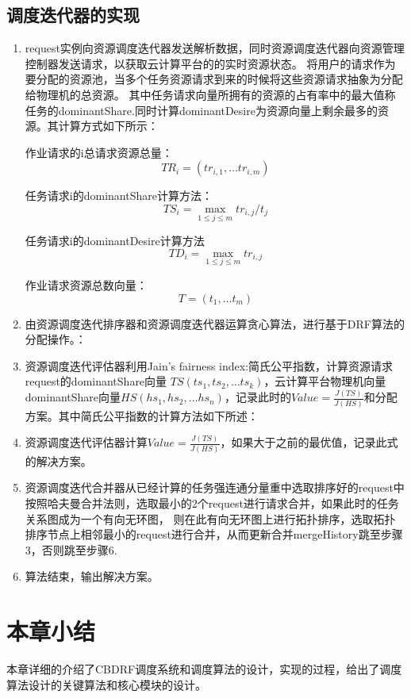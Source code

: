 \subsection{调度迭代器的实现}
\begin{enumerate}
\item request实例向资源调度迭代器发送解析数据，同时资源调度迭代器向资源管理控制器发送请求，以获取云计算平台的的实时资源状态。
将用户的请求作为要分配的资源池，当多个任务资源请求到来的时候将这些资源请求抽象为分配给物理机的总资源。
其中任务请求向量所拥有的资源的占有率中的最大值称任务的dominantShare.同时计算dominantDesire为资源向量上剩余最多的资源。其计算方式如下所示：

作业请求的i总请求资源总量：
\begin{equation}
{TR}_{i}=\left({tr}_{i,1},…{tr}_{i,m}\right)
\end{equation}

任务请求i的dominantShare计算方法：
\begin{equation}
{TS}_{i}=\max \limits_{1 \leq j \leq m} {{tr}_{i,j}}/{{t}_{j}}
\end{equation}

任务请求i的dominantDesire计算方法
\begin{equation}
{TD}_{i}=\max \limits_{1 \leq j \leq m} {tr}_{i,j}
\end{equation}

作业请求资源总数向量：
\begin{equation}
T=\left({t}_{1},…{t}_{m}\right)
\end{equation}
\item 由资源调度迭代排序器和资源调度迭代器运算贪心算法，进行基于DRF算法的分配操作。：
\item 资源调度迭代评估器利用Jain’s fairness index:简氏公平指数，计算资源请求request的dominantShare向量
$TS\left({ts}_{1},{ts}_{2},…{ts}_{k}\right )$，云计算平台物理机向量dominantShare向量$HS\left({hs}_{1},{hs}_{2},…{hs}_{n}\right )$，记录此时的$Value = \frac{J(TS)}{J(HS)}$和分配方案。其中简氏公平指数的计算方法如下所述：
\item 资源调度迭代评估器计算$Value = \frac{J(TS)}{J(HS)}$，如果大于之前的最优值，记录此式的解决方案。
\item 资源调度迭代合并器从已经计算的任务强连通分量重中选取排序好的request中按照哈夫曼合并法则，选取最小的2个request进行请求合并，如果此时的任务关系图成为一个有向无环图，
则在此有向无环图上进行拓扑排序，选取拓扑排序节点上相邻最小的request进行合并，从而更新合并mergeHistory跳至步骤3，否则跳至步骤6.
\item 算法结束，输出解决方案。
\end{enumerate}

\section{本章小结}
本章详细的介绍了CBDRF调度系统和调度算法的设计，实现的过程，给出了调度算法设计的关键算法和核心模块的设计。